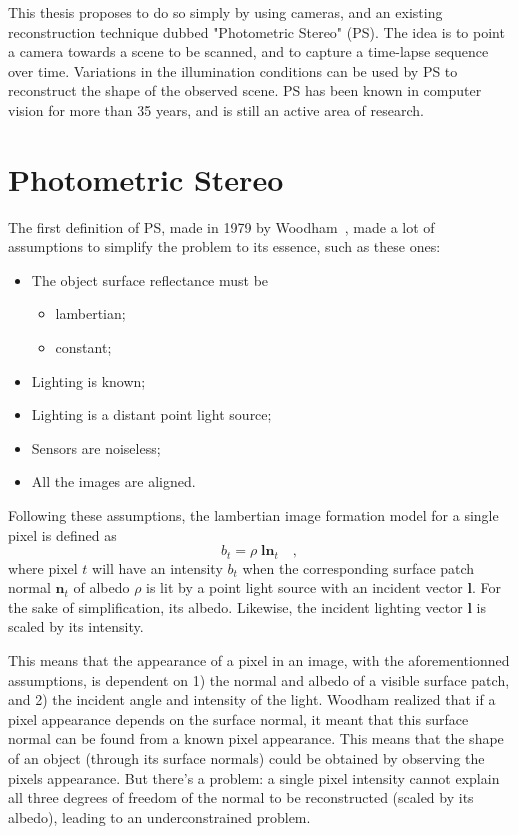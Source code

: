 \documentclass{report}
\begin{document}
This thesis proposes to do so simply by using cameras, and an existing reconstruction technique dubbed "Photometric Stereo" (PS). The idea is to point a camera towards a scene to be scanned, and to capture a time-lapse sequence over time. Variations in the illumination conditions can be used by PS to reconstruct the shape of the observed scene. PS has been known in computer vision for more than 35 years, and is still an active area of research.

\section{Photometric Stereo}
\label{sec:ps_ori}

The first definition of PS, made in 1979 by Woodham~\cite{Woodham1979}, made a lot of assumptions to simplify the problem to its essence, such as these ones:

\begin{itemize} \setlength\itemsep{-0.2em}
  \item The object surface reflectance must be
  \vspace{-0.65em}\begin{itemize} \setlength\itemsep{0.1em}
    \item lambertian;
    \item constant;
  \end{itemize} \vspace{-0.4em}
  \item Lighting is known;
  \item Lighting is a distant point light source;
  \item Sensors are noiseless;
  \item All the images are aligned.
\end{itemize}

Following these assumptions, the lambertian image formation model for a single pixel is defined as
\begin{equation}
b_t =  \rho \; \mathbf{l} \mathbf{n}_t \quad,
\end{equation}
where pixel $t$ will have an intensity $b_t$ when the corresponding surface patch normal $\mathbf{n}_t$ of albedo $\rho$ is lit by a point light source with an incident vector $\mathbf{l}$. For the sake of simplification, its albedo. Likewise, the incident lighting vector $\mathbf{l}$ is scaled by its intensity.

This means that the appearance of a pixel in an image, with the aforementionned assumptions, is dependent on 1) the normal and albedo of a visible surface patch, and 2) the incident angle and intensity of the light. Woodham realized that if a pixel appearance depends on the surface normal, it meant that this surface normal can be found from a known pixel appearance. This means that the shape of an object (through its surface normals) could be obtained by observing the pixels appearance. But there's a problem: a single pixel intensity cannot explain all three degrees of freedom of the normal to be reconstructed (scaled by its albedo), leading to an underconstrained problem.
\end{document}
